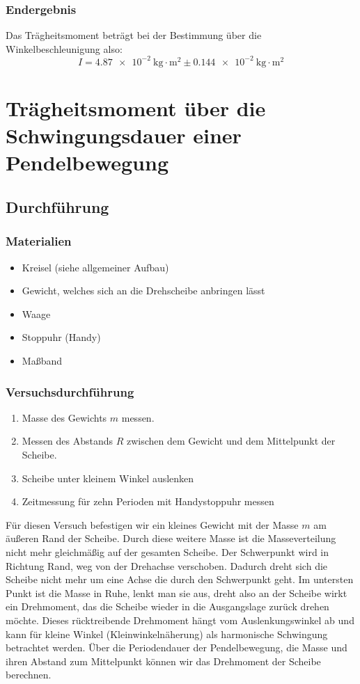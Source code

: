 \documentclass{article}
\begin{document}
	\subsubsection{Endergebnis}
	Das Trägheitsmoment beträgt bei der Bestimmung über die Winkelbeschleunigung also:
	\begin{equation}
		I = \SI{4,87e-2}{ \kilogram \cdot \metre^2 } \pm \SI{0,144e-2}{ \kilogram \cdot \metre^2 }
	\end{equation}

	\section{Trägheitsmoment über die Schwingungsdauer einer Pendelbewegung}

	\subsection{Durchführung}
	\subsubsection{Materialien}
	\begin{itemize}
		\item Kreisel (siehe allgemeiner Aufbau)
		\item Gewicht, welches sich an die Drehscheibe anbringen lässt
		\item Waage
		\item Stoppuhr (Handy)
		\item Maßband
	\end{itemize}

	\subsubsection{Versuchsdurchführung}
	\begin{enumerate}
		\item Masse des Gewichts \(m\) messen.
		\item Messen des Abstands \(R\) zwischen dem Gewicht und dem Mittelpunkt der Scheibe.
		\item Scheibe unter kleinem Winkel auslenken
		\item Zeitmessung für zehn Perioden mit Handystoppuhr messen
	\end{enumerate}
	Für diesen Versuch befestigen wir ein kleines Gewicht mit der Masse \(m\) am äußeren Rand der Scheibe.
	Durch diese weitere Masse ist die Masseverteilung nicht mehr gleichmäßig auf der gesamten Scheibe. Der Schwerpunkt wird in Richtung Rand, weg von der Drehachse verschoben.
	Dadurch dreht sich die Scheibe nicht mehr um eine Achse die durch den Schwerpunkt geht.
	Im untersten Punkt ist die Masse in Ruhe, lenkt man sie aus, dreht also an der Scheibe wirkt ein Drehmoment, das die Scheibe wieder in die Ausgangslage zurück drehen möchte.
	Dieses rücktreibende Drehmoment hängt vom Auslenkungswinkel ab und kann für kleine Winkel (Kleinwinkelnäherung) als harmonische Schwingung betrachtet werden.
	Über die Periodendauer der Pendelbewegung, die Masse und ihren Abstand zum Mittelpunkt können wir das Drehmoment der Scheibe berechnen.
\end{document}
